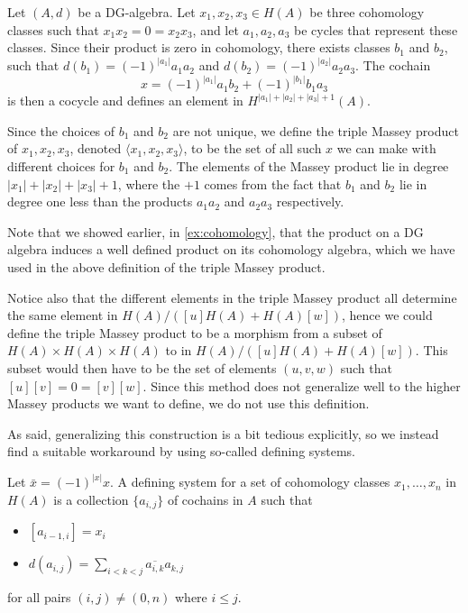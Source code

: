 \begin{definition}
\label{def:triple_massey}
Let $(A,d)$ be a DG-algebra. Let $x_1, x_2, x_3 \in H(A)$ be three cohomology classes such that $x_1 x_2 = 0 = x_2 x_3$, and let $a_1, a_2, a_3$ be cycles that represent these classes. Since their product is zero in cohomology, there exists classes $b_1$ and $b_2$, such that $d(b_1)=(-1)^{|a_1|}a_1a_2$ and $d(b_2)=(-1)^{|a_2|}a_2a_3$. The cochain 
\begin{equation*}
    x = (-1)^{|a_1|}a_1 b_2 + (-1)^{|b_1|}b_1 a_3
\end{equation*}
is then a cocycle and defines an element in $H^{|a_1|+|a_2|+|a_3|+1}(A)$.  

Since the choices of $b_1$ and $b_2$ are not unique, we define the triple Massey product of $x_1, x_2, x_3$, denoted $\langle x_1, x_2, x_3 \rangle$, to be the set of all such $x$ we can make with different choices for $b_1$ and $b_2$. The elements of the Massey product lie in degree $|x_1|+|x_2|+|x_3|+1$, where the $+1$ comes from the fact that $b_1$ and $b_2$ lie in degree one less than the products $a_1 a_2$ and $a_2 a_3$ respectively. 
\end{definition} 

\begin{remark}
Note that we showed earlier, in \cref{ex:cohomology}, that the product on a DG algebra induces a well defined product on its cohomology algebra, which we have used in the above definition of the triple Massey product.  
\end{remark}

Notice also that the different elements in the triple Massey product all determine the same element in $H(A)/([u]H(A)+H(A)[w])$, hence we could define the triple Massey product to be a morphism from a subset of $H(A)\times H(A)\times H(A)$ to in $H(A)/([u]H(A)+H(A)[w])$. This subset would then have to be the set of elements $(u, v, w)$ such that $[u][v] = 0 = [v][w]$. Since this method does not generalize well to the higher Massey products we want to define, we do not use this definition. 

As said, generalizing this construction is a bit tedious explicitly, so we instead find a suitable workaround by using so-called defining systems. 

\begin{definition}
\label{def:defining_system}
Let $\bar{x} = (-1)^{|x|}x$. A defining system for a set of cohomology classes $x_1, \ldots, x_n$ in $ H(A)$ is a collection $\{ a_{i,j}\}$ of cochains in $A$ such that
\begin{itemize}
    \item $[a_{i-1, i}] = x_i$
    \item $d(a_{i, j}) = \displaystyle\sum_{i<k<j}\overline{a_{i, k}}a_{k, j}$
\end{itemize}
for all pairs $(i,j)\neq (0,n)$ where $i\leq j$.
\end{definition}

